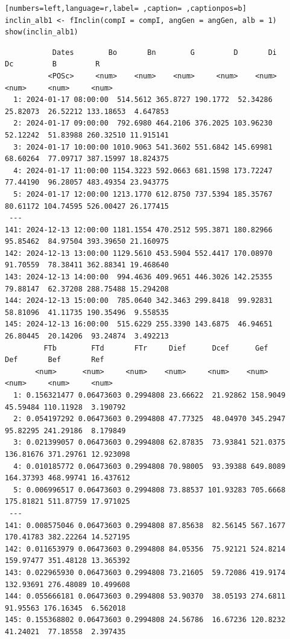 \begin{itemize}
\begin{lstlisting}[numbers=left,language=r,label= ,caption= ,captionpos=b]
inclin_alb1 <- fInclin(compI = compI, angGen = angGen, alb = 1)
show(inclin_alb1)
\end{lstlisting}

\begin{verbatim}
		   Dates        Bo       Bn        G         D       Di        Dc         B         R
		  <POSc>     <num>    <num>    <num>     <num>    <num>     <num>     <num>     <num>
  1: 2024-01-17 08:00:00  514.5612 365.8727 190.1772  52.34286 25.82073  26.52212 133.18653  4.647853
  2: 2024-01-17 09:00:00  792.6980 464.2106 376.2025 103.96230 52.12242  51.83988 260.32510 11.915141
  3: 2024-01-17 10:00:00 1010.9063 541.3602 551.6842 145.69981 68.60264  77.09717 387.15997 18.824375
  4: 2024-01-17 11:00:00 1154.3223 592.0663 681.1598 173.72247 77.44190  96.28057 483.49354 23.943775
  5: 2024-01-17 12:00:00 1213.1770 612.8750 737.5394 185.35767 80.61172 104.74595 526.00427 26.177415
 ---                                                                                                 
141: 2024-12-13 12:00:00 1181.1554 470.2512 595.3871 180.82966 95.85462  84.97504 393.39650 21.160975
142: 2024-12-13 13:00:00 1129.5610 453.5904 552.4417 170.08970 91.70559  78.38411 362.88341 19.468640
143: 2024-12-13 14:00:00  994.4636 409.9651 446.3026 142.25355 79.88147  62.37208 288.75488 15.294208
144: 2024-12-13 15:00:00  785.0640 342.3463 299.8418  99.92831 58.81096  41.11735 190.35496  9.558535
145: 2024-12-13 16:00:00  515.6229 255.3390 143.6875  46.94651 26.80445  20.14206  93.24874  3.492213
	     FTb        FTd       FTr     Dief      Dcef      Gef       Def       Bef       Ref
	   <num>      <num>     <num>    <num>     <num>    <num>     <num>     <num>     <num>
  1: 0.156321477 0.06473603 0.2994808 23.66622  21.92862 158.9049  45.59484 110.11928  3.190792
  2: 0.054197292 0.06473603 0.2994808 47.77325  48.04970 345.2947  95.82295 241.29186  8.179849
  3: 0.021399057 0.06473603 0.2994808 62.87835  73.93841 521.0375 136.81676 371.29761 12.923098
  4: 0.010185772 0.06473603 0.2994808 70.98005  93.39388 649.8089 164.37393 468.99741 16.437612
  5: 0.006996517 0.06473603 0.2994808 73.88537 101.93283 705.6668 175.81821 511.87759 17.971025
 ---                                                                                           
141: 0.008575046 0.06473603 0.2994808 87.85638  82.56145 567.1677 170.41783 382.22264 14.527195
142: 0.011653979 0.06473603 0.2994808 84.05356  75.92121 524.8214 159.97477 351.48128 13.365392
143: 0.022965930 0.06473603 0.2994808 73.21605  59.72086 419.9174 132.93691 276.48089 10.499608
144: 0.055666181 0.06473603 0.2994808 53.90370  38.05193 274.6811  91.95563 176.16345  6.562018
145: 0.155368802 0.06473603 0.2994808 24.56786  16.67236 120.8232  41.24021  77.18558  2.397435
\end{verbatim}


\end{itemize}
